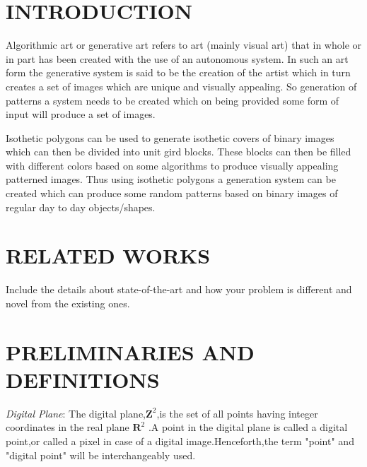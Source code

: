 \documentclass[12pt]{article}
\begin{document}
\newpage
\tableofcontents
\newpage
\newenvironment{mydef}[1]{\begin{definition} #1 \mbox{\\}
\rm}{\end{definition}}




\section{INTRODUCTION}
Algorithmic art or generative art refers to art (mainly visual art) that in whole or in part has been created with the use of an autonomous system. In such an art form the generative system is said to be the creation of the artist which in turn creates a set of images which are unique and visually appealing.  
So generation of patterns a system needs to be created which on being provided some form of input will produce a set of images.

\vspace{0.3cm} 
Isothetic polygons can be used to generate isothetic covers of binary images which can then be divided into unit gird blocks. These blocks can then be filled with different colors based on some algorithms to produce visually appealing patterned images. Thus using isothetic polygons a generation system can be created which can produce some random patterns based on binary images of regular day to day objects/shapes. 
\vspace{0.3cm}

\newpage




\section{RELATED WORKS}
Include the details about state-of-the-art and how your problem is different and novel from the existing ones.




\newpage




\section{PRELIMINARIES AND DEFINITIONS}


\textit{Digital Plane}: The digital plane,$\textbf{Z}^2$,is the set of all points having 
integer coordinates in the real plane $\textbf{R}^2$ .A point in the digital plane is 
called a digital point,or called a pixel in case of a digital image.Henceforth,the term
"point" and "digital point" will be interchangeably used.
\break
\end{document}
